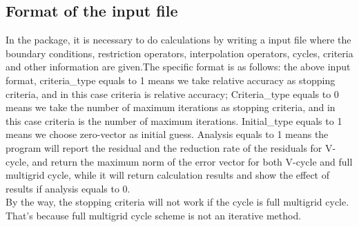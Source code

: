 \documentclass[a4paper,twocolumn]{article}
\theoremstyle{definition}
\begin{document}
\subsection{Format of the input file}
In the package, it is necessary to do calculations by writing a input file where the boundary conditions, restriction operators, interpolation operators, cycles, criteria and other information are given.The specific format is as follows:
\newpage
\noindent the above input format, criteria\_type equals to 1 means we take relative accuracy as  stopping criteria, and in this case criteria is relative accuracy; Criteria\_type equals to 0 means we take the number of maximum iterations as stopping criteria, and in this case criteria is the number of maximum iterations. Initial\_type equals to 1 means we choose  zero-vector as initial guess. Analysis equals to 1 means the program will report the residual and the reduction rate of the residuals for V-cycle, and return the maximum norm of the error vector for both V-cycle and full multigrid cycle, while it will return calculation results and show the effect of results if analysis equals to 0.\\
By the way, the stopping criteria will not work if the cycle is full multigrid cycle. That's because full multigrid cycle scheme is not an iterative method.
\end{document}
